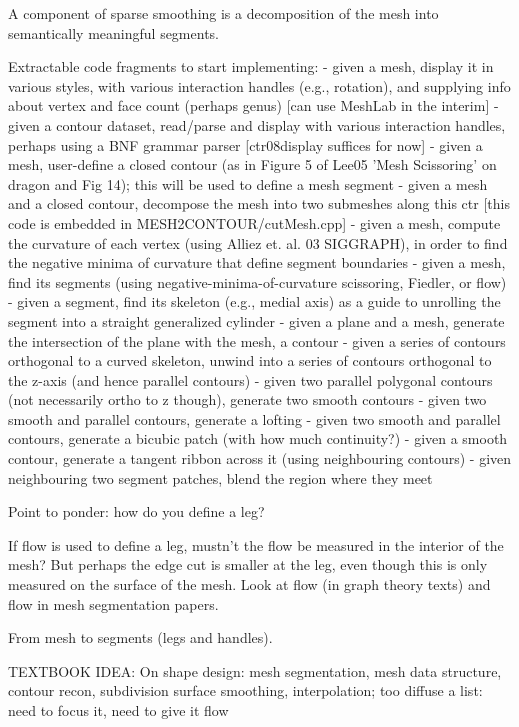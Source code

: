 \documentclass[11pt]{article}
\begin{document}
A component of sparse smoothing
is a decomposition of the mesh into semantically meaningful segments.

Extractable code fragments to start implementing:
- given a mesh, display it in various styles, with various interaction 
  handles (e.g., rotation), and supplying info about vertex and face count (perhaps genus)
  [can use MeshLab in the interim]
- given a contour dataset, read/parse and display with various interaction handles,
     perhaps using a BNF grammar parser 
     [ctr08display suffices for now]
- given a mesh, user-define a closed contour 
     (as in Figure 5 of Lee05 'Mesh Scissoring' on dragon and Fig 14); 
     this will be used to define a mesh segment
- given a mesh and a closed contour, decompose the mesh into two submeshes along this ctr
     [this code is embedded in MESH2CONTOUR/cutMesh.cpp]
- given a mesh, compute the curvature of each vertex 
     (using Alliez et. al. 03 SIGGRAPH),
     in order to find the negative minima of curvature that define segment boundaries
- given a mesh, find its segments 
     (using negative-minima-of-curvature scissoring, Fiedler, or flow)
- given a segment, find its skeleton (e.g., medial axis)
     as a guide to unrolling the segment into a straight generalized cylinder
- given a plane and a mesh, generate the intersection of the plane with the mesh, a contour
- given a series of contours orthogonal to a curved skeleton, unwind into a series of
  contours orthogonal to the z-axis (and hence parallel contours)
- given two parallel polygonal contours (not necessarily ortho to z though), 
  generate two smooth contours
- given two smooth and parallel contours, generate a lofting
- given two smooth and parallel contours, generate a bicubic patch 
  (with how much continuity?)
- given a smooth contour, generate a tangent ribbon across it (using neighbouring contours)
- given neighbouring two segment patches, blend the region where they meet

Point to ponder: how do you define a leg?

If flow is used to define a leg, mustn't the flow be measured in the interior of the mesh?
But perhaps the edge cut is smaller at the leg, even though this is only measured on the
surface of the mesh. Look at flow (in graph theory texts) and flow in mesh segmentation
papers.

From mesh to segments (legs and handles).

TEXTBOOK IDEA:
On shape design: mesh segmentation, mesh data structure, contour recon, 
subdivision surface smoothing, interpolation; 
too diffuse a list: need to focus it, need to give it flow
\end{document}

